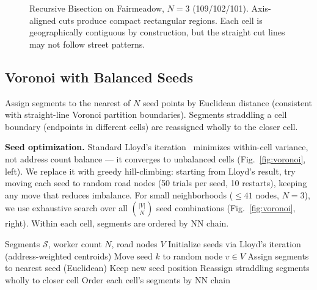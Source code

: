 \documentclass[conference]{IEEEtran}
\begin{document}
\begin{figure}[htbp]
\centering
{}
\caption{Recursive Bisection on Fairmeadow, $N=3$ (109/102/101). Axis-aligned cuts produce compact rectangular regions. Each cell is geographically contiguous by construction, but the straight cut lines may not follow street patterns.}
\end{figure}

\subsection{Voronoi with Balanced Seeds}

Assign segments to the nearest of $N$ seed points by Euclidean distance (consistent with straight-line Voronoi partition boundaries). Segments straddling a cell boundary (endpoints in different cells) are reassigned wholly to the closer cell.

\textbf{Seed optimization.} Standard Lloyd's iteration~\cite{lloyd1982} minimizes within-cell variance, not address count balance --- it converges to unbalanced cells (Fig.~\ref{fig:voronoi}, left). We replace it with greedy hill-climbing: starting from Lloyd's result, try moving each seed to random road nodes (50 trials per seed, 10 restarts), keeping any move that reduces imbalance. For small neighborhoods ($\leq 41$ nodes, $N = 3$), we use exhaustive search over all $\binom{|V|}{N}$ seed combinations (Fig.~\ref{fig:voronoi}, right). Within each cell, segments are ordered by NN chain.

\begin{algorithm}[htbp]
\caption{Voronoi with Balanced Seeds}
\begin{algorithmic}[1]
\REQUIRE Segments $\mathcal{S}$, worker count $N$, road nodes $V$
\STATE Initialize seeds via Lloyd's iteration (address-weighted centroids)
            \STATE Move seed $k$ to random node $v \in V$
            \STATE Assign segments to nearest seed (Euclidean)
                \STATE Keep new seed position
            \ENDIF
        \ENDFOR
    \ENDFOR
\ENDFOR
\STATE Reassign straddling segments wholly to closer cell
\STATE Order each cell's segments by NN chain
\end{algorithmic}
\end{algorithm}
\end{document}
